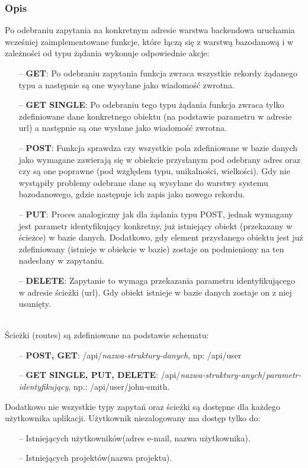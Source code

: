 \documentclass[eng,printmode]{mgr}
\begin{document}
\subsubsection{Opis}
Po odebraniu zapytania na konkretnym adresie warstwa backendowa uruchamia wcześniej zaimplementowane funkcje, które łączą się z warstwą bazodanową i w zależności od typu żądania wykonuje odpowiednie akcje:
\begin{itemize}
  \item[--] \textbf{GET}: Po odebraniu zapytania funkcja zwraca wszystkie rekordy żądanego typu a następnie są one wysyłane jako wiadomość zwrotna.
  \item[--] \textbf{GET SINGLE}: Po odebraniu tego typu żądania funkcja zwraca tylko zdefiniowane dane konkretnego obiektu (na podstawie parametru w adresie url) a następnie są one wysłane jako wiadomość zwrotna.
  \item[--] \textbf{POST}: Funkcja sprawdza czy wszystkie pola zdefiniowane w bazie danych jako wymagane zawierają się w obiekcie przysłanym pod odebrany adres oraz czy są one poprawne (pod względem typu, unikalności, wielkości). Gdy nie wystąpiły problemy odebrane dane są wysyłane do warstwy systemu bazodanowego, gdzie następuje ich zapis jako nowego rekordu.
  \item[--] \textbf{PUT}: Proces analogiczny jak dla żądania typu POST, jednak wymagany jest parametr identyfikujący konkretny, już istniejący obiekt (przekazany w ścieżce) w bazie danych. Dodatkowo, gdy element przysłanego obiektu jest już zdefiniowany (istnieje w obiekcie w bazie) zostaje on podmieniony na ten nadesłany w zapytaniu.
  \item[--] \textbf{DELETE}: Zapytanie to wymaga przekazania parametru identyfikującego w adresie ścieżki (url). Gdy obiekt istnieje w bazie danych zostaje on z niej usunięty.
\end{itemize}
\ \\
Ścieżki (routes) są zdefiniowane na podstawie schematu:
\begin{itemize}
  \item[--] \textbf{POST, GET}: /api/\textit{nazwa-struktury-danych}, np: /api/user
  \item[--] \textbf{GET SINGLE, PUT, DELETE}: /api/\textit{nazwa-struktury-anych}/\textit{parametr-identyfikujący}, np.: /api/user/john-smith.
\end{itemize}
Dodatkowo nie wszystkie typy zapytań oraz ścieżki są dostępne dla każdego użytkownika aplikacji. Użytkownik niezalogowany ma dostęp tylko do:
\begin{itemize}
  \item [--] Istniejących użytkowników(adres e-mail, nazwa użytkownika).
  \item[--] Istniejących projektów(nazwa projektu).
\end{itemize}
\end{document}
